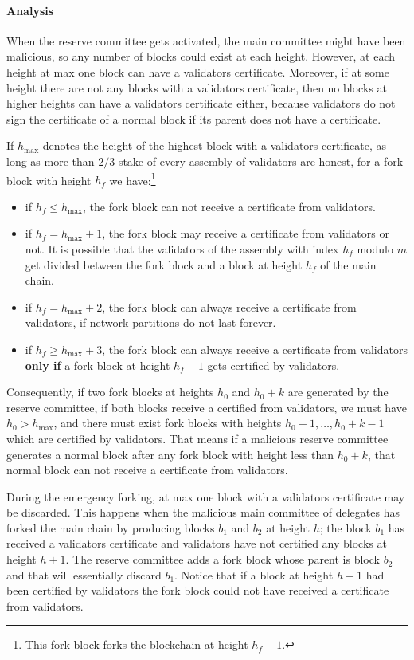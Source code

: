 \paragraph{Analysis}

When the reserve committee gets activated, the main committee might have been malicious, so any number of blocks could
exist at each height. However, at each height at max one block can have a validators certificate. Moreover, if at some
height there are not any blocks with a validators certificate, then no blocks at higher heights can have a
validators certificate either, because validators do not sign the certificate of a normal block if its parent does
not have a certificate.

If $h_{\max}$ denotes the height of the highest block with a validators certificate, as long as more than $2/3$ stake
of every assembly of validators are honest, for a fork block with height $h_f$ we have:\footnote{This fork block
forks the blockchain at height $h_f-1$.}
\begin{itemize}
    \item if $h_f \leq h_{\max}$, the fork block can not receive a certificate from validators.
    \item if $h_f = h_{\max} + 1$, the fork block may receive a certificate from validators or not. It is possible that
    the validators of the assembly with index $h_f$ modulo $m$ get divided between the fork block and a block at
    height $h_f$ of the main chain.
    \item if $h_f = h_{\max} + 2$, the fork block can always receive a certificate from validators, if network
    partitions do not last forever.
    \item if $h_f \geq h_{\max} + 3$, the fork block can always receive a certificate from validators \textbf{only if} a
    fork block at height $h_f-1$ gets certified by validators.
\end{itemize}

Consequently, if two fork blocks at heights $h_0$ and $h_0+k$ are generated by the reserve committee, if both blocks
receive a certified from validators, we must have $h_0 > h_{\max}$, and there must exist fork blocks with heights
$h_0+1,\dots,h_0+k-1$ which are certified by validators. That means if a malicious reserve committee generates a normal
block after any fork block with height less than $h_0+k$, that normal block can not receive a certificate from
validators.

During the emergency forking, at max one block with a validators certificate may be discarded. This happens when
the malicious main committee of delegates has forked the main chain by producing blocks $b_1$ and $b_2$ at height
$h$; the block $b_1$ has received a validators certificate and validators have not certified any blocks at height $h+1$.
The reserve committee adds a fork block whose parent is block $b_2$ and that will essentially discard $b_1$. Notice
that if a block at height $h+1$ had been certified by validators the fork block could not have received a certificate
from validators.

